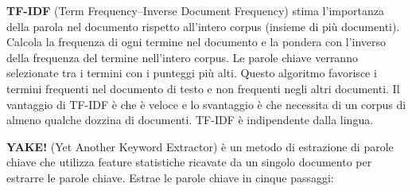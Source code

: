 \textbf{TF-IDF} (Term Frequency–Inverse Document Frequency) stima l'importanza della parola nel documento rispetto all'intero corpus (insieme di più documenti). Calcola la frequenza di ogni termine nel documento e la pondera con l'inverso della frequenza del termine nell'intero corpus. Le parole chiave verranno selezionate tra i termini con i punteggi più alti. Questo algoritmo favorisce i termini frequenti nel documento di testo e non frequenti negli altri documenti. Il vantaggio di TF-IDF è che è veloce e lo svantaggio è che necessita di un corpus di almeno qualche dozzina di documenti. TF-IDF è indipendente dalla lingua.

\textbf{YAKE!} (Yet Another Keyword Extractor) è un metodo di estrazione di parole chiave che utilizza feature statistiche ricavate da un singolo documento per estrarre le parole chiave. Estrae le parole chiave in cinque passaggi:
